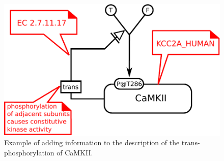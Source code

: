 \begin{figure}[H]
  \centering
  \includegraphics[scale = 0.5]{examples/ex-annotation}
  \caption{Example of  adding information to the description of the trans-phosphorylation of CaMKII.}
  \label{fig:ex-annotation}
\end{figure}

